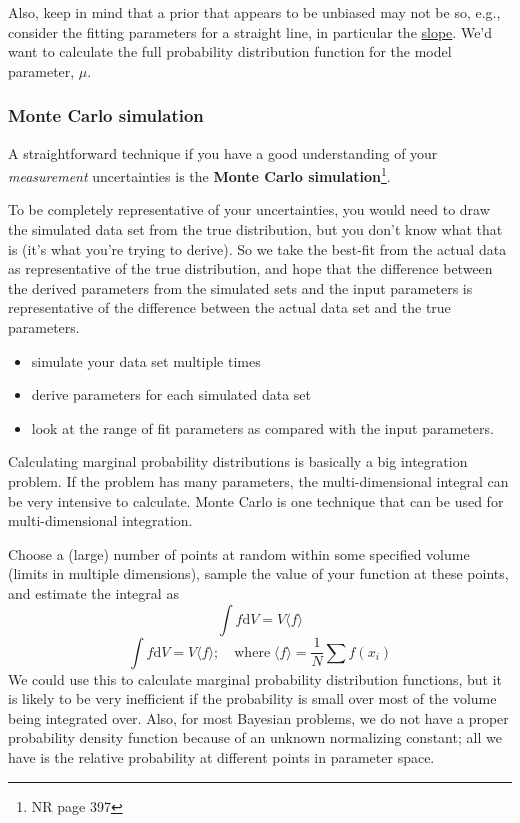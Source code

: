 \documentclass{article}
\begin{document}
Also, keep in mind that a prior that appears to be unbiased may not be so,
e.g., consider the fitting parameters for a straight line, in particular the
\href{http://astronomy.nmsu.edu/holtz/a575/images/slope.png}
{slope}.
We'd want to
calculate the full probability distribution function for the model parameter,
$\mu$.

\subsubsection{Monte Carlo simulation}
A straightforward technique if you have a good understanding of your
\emph{measurement} uncertainties is the
\textbf{Monte Carlo simulation}\footnote{NR page 397}.

To be completely representative of your uncertainties, you would need to draw
the simulated data set from the true distribution, but you don't know what that
is (it's what you're trying to derive). So we take the best-fit from the actual
data as representative of the true distribution, and hope that the difference
between the derived parameters from the simulated sets and the input parameters
is representative of the difference between the actual data set and the true
parameters.

\begin{itemize}
    \item simulate your data set multiple times
    \item derive parameters for each simulated data set
    \item look at the range of fit parameters as compared with
        the input parameters.
\end{itemize}

Calculating
marginal probability distributions is basically a big integration problem. If
the problem has many parameters, the multi-dimensional integral can be very
intensive to calculate. Monte Carlo is one technique that can be used for
multi-dimensional integration.

Choose a (large) number of points at random
within some specified volume (limits in multiple dimensions), sample the value
of your function at these points, and estimate the integral as
\[
    \int{ \! f \mathrm{d}V = V\langle f \rangle }
    \]
\[
    \int{ f \mathrm{d}V = V\langle f \rangle }; \quad \mathrm{where}\;
    \langle f \rangle = \frac{1}{N}\sum{ f \left( x_{i} \right) }
    \]
We could use this to calculate marginal probability distribution functions, but
it is likely to be very inefficient if the probability is small over most of
the volume being integrated over. Also, for most Bayesian problems, we do not
have a proper probability density function because of an unknown normalizing
constant; all we have is the relative probability at different points in
parameter space.
\end{document}
